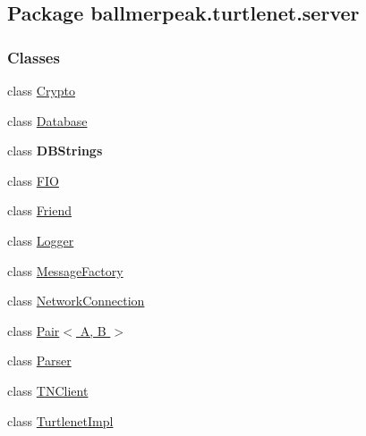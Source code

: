 \hypertarget{namespaceballmerpeak_1_1turtlenet_1_1server}{\subsection{Package ballmerpeak.\-turtlenet.\-server}
\label{namespaceballmerpeak_1_1turtlenet_1_1server}
}
\subsubsection*{Classes}
\begin{DoxyCompactItemize}
\item 
class \hyperlink{classballmerpeak_1_1turtlenet_1_1server_1_1Crypto}{Crypto}
\item 
class \hyperlink{classballmerpeak_1_1turtlenet_1_1server_1_1Database}{Database}
\item 
class {\bfseries D\-B\-Strings}
\item 
class \hyperlink{classballmerpeak_1_1turtlenet_1_1server_1_1FIO}{F\-I\-O}
\item 
class \hyperlink{classballmerpeak_1_1turtlenet_1_1server_1_1Friend}{Friend}
\item 
class \hyperlink{classballmerpeak_1_1turtlenet_1_1server_1_1Logger}{Logger}
\item 
class \hyperlink{classballmerpeak_1_1turtlenet_1_1server_1_1MessageFactory}{Message\-Factory}
\item 
class \hyperlink{classballmerpeak_1_1turtlenet_1_1server_1_1NetworkConnection}{Network\-Connection}
\item 
class \hyperlink{classballmerpeak_1_1turtlenet_1_1server_1_1Pair_3_01A_00_01B_01_4}{Pair$<$ A, B $>$}
\item 
class \hyperlink{classballmerpeak_1_1turtlenet_1_1server_1_1Parser}{Parser}
\item 
class \hyperlink{classballmerpeak_1_1turtlenet_1_1server_1_1TNClient}{T\-N\-Client}
\item 
class \hyperlink{classballmerpeak_1_1turtlenet_1_1server_1_1TurtlenetImpl}{Turtlenet\-Impl}
\end{DoxyCompactItemize}
